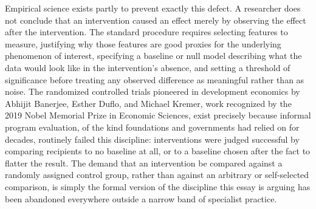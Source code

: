 \documentclass[11pt]{article}
\begin{document}
Empirical science exists partly to prevent exactly this defect. A researcher does not conclude that an intervention caused an effect merely by observing the effect after the intervention. The standard procedure requires selecting features to measure, justifying why those features are good proxies for the underlying phenomenon of interest, specifying a baseline or null model describing what the data would look like in the intervention's absence, and setting a threshold of significance before treating any observed difference as meaningful rather than as noise. The randomized controlled trials pioneered in development economics by Abhijit Banerjee, Esther Duflo, and Michael Kremer, work recognized by the 2019 Nobel Memorial Prize in Economic Sciences, exist precisely because informal program evaluation, of the kind foundations and governments had relied on for decades, routinely failed this discipline: interventions were judged successful by comparing recipients to no baseline at all, or to a baseline chosen after the fact to flatter the result. The demand that an intervention be compared against a randomly assigned control group, rather than against an arbitrary or self-selected comparison, is simply the formal version of the discipline this essay is arguing has been abandoned everywhere outside a narrow band of specialist practice.
\end{document}
